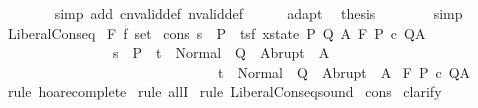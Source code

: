 \begin{isabellebody}
\ \ \ \ \ \ \isamarkupfalse%
\ {\isacharparenleft}simp\ add{\isacharcolon}\ cnvalid{\isacharunderscore}def\ nvalid{\isacharunderscore}def{\isacharparenright}\isanewline
\ \ \ \ \isamarkupfalse%
\ adapt\ \isamarkupfalse%
\ {\isacharquery}thesis\isanewline
\ \ \ \ \ \ \isamarkupfalse%
\ simp\isanewline
\ \ \isamarkupfalse%
\isanewline
{}\isamarkupfalse%
%
\endisatagproof
{\isafoldproof}%
%
\isadelimproof
\isanewline
%
\endisadelimproof
\isanewline
{}\isamarkupfalse%
\ LiberalConseq{\isacharcolon}\isanewline
{}\ F{\isacharcolon}{\isacharcolon}\ {\isachardoublequoteopen}{\isacharprime}f\ set{\isachardoublequoteclose}\isanewline
{}\ cons{\isacharcolon}\ {\isachardoublequoteopen}{\isasymforall}s\ {\isasymin}\ P{\isachardot}\ \ {\isasymforall}{\isacharparenleft}t{\isacharcolon}{\isacharcolon}{\isacharparenleft}{\isacharprime}s{\isacharcomma}{\isacharprime}f{\isacharparenright}\ xstate{\isacharparenright}{\isachardot}\ {\isasymexists}P{\isacharprime}\ Q{\isacharprime}\ A{\isacharprime}{\isachardot}\ {\isasymGamma}{\isacharcomma}{\isasymTheta}{\isasymturnstile}\isactrlbsub {\isacharslash}F\isactrlesub \ P{\isacharprime}\ c\ Q{\isacharprime}{\isacharcomma}A{\isacharprime}\ {\isasymand}\isanewline
\ \ \ \ \ \ \ \ \ \ \ \ \ \ \ \ {\isacharparenleft}{\isacharparenleft}s\ {\isasymin}\ P{\isacharprime}\ {\isasymlongrightarrow}\ t\ {\isasymin}\ Normal\ {\isacharbackquote}\ Q{\isacharprime}\ {\isasymunion}\ Abrupt\ {\isacharbackquote}\ A{\isacharprime}{\isacharparenright}\isanewline
\ \ \ \ \ \ \ \ \ \ \ \ \ \ \ \ \ \ \ \ \ \ \ \ \ \ \ \ \ \ {\isasymlongrightarrow}\ t\ {\isasymin}\ Normal\ {\isacharbackquote}\ Q\ {\isasymunion}\ Abrupt\ {\isacharbackquote}\ A{\isacharparenright}{\isachardoublequoteclose}\isanewline
{}\ {\isachardoublequoteopen}{\isasymGamma}{\isacharcomma}{\isasymTheta}{\isasymturnstile}\isactrlbsub {\isacharslash}F\isactrlesub \ P\ c\ Q{\isacharcomma}A\ {\isachardoublequoteclose}\isanewline
%
\isadelimproof
%
\endisadelimproof
%
\isatagproof
{}\isamarkupfalse%
\ {\isacharparenleft}rule\ hoare{\isacharunderscore}complete{\isacharprime}{\isacharparenright}\isanewline
{}\isamarkupfalse%
\ {\isacharparenleft}rule\ allI{\isacharparenright}\isanewline
{}\isamarkupfalse%
\ {\isacharparenleft}rule\ LiberalConseq{\isacharunderscore}sound{\isacharparenright}\isanewline
{}\isamarkupfalse%
\ cons\isanewline
{}\isamarkupfalse%
\ {\isacharparenleft}clarify{\isacharparenright}\isanewline

\end{isabellebody}
